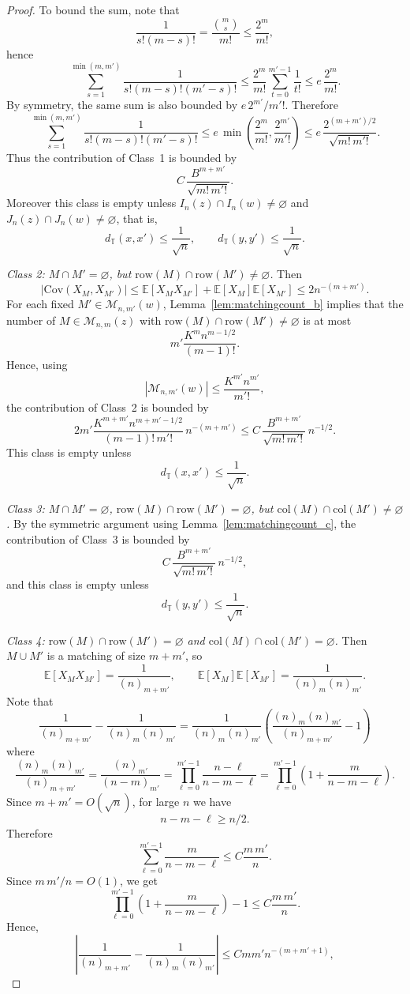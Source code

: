 \documentclass[10pt,a4paper]{amsart}
\newcommand{\cov}{\mathrm{Cov}}
\begin{document}
\begin{proof}
To bound the sum, note that
\[
\frac{1}{s!(m-s)!}=\frac{\binom{m}{s}}{m!}\le \frac{2^m}{m!},
\]
hence
\[
\sum_{s=1}^{\min(m,m')}
\frac{1}{s!(m-s)!(m'-s)!}
\le
\frac{2^m}{m!}\sum_{t=0}^{m'-1}\frac{1}{t!}
\le
e\,\frac{2^m}{m!}.
\]
By symmetry, the same sum is also bounded by $e\,2^{m'}/m'!$. Therefore
\[
\sum_{s=1}^{\min(m,m')}
\frac{1}{s!(m-s)!(m'-s)!}
\le
e\,\min\!\left(\frac{2^m}{m!},\frac{2^{m'}}{m'!}\right)
\le
e\,\frac{2^{(m+m')/2}}{\sqrt{m!\,m'!}}.
\]
Thus the contribution of Class~1 is bounded by
\[
C\,\frac{B^{m+m'}}{\sqrt{m!\,m'!}}.
\]
Moreover this class is empty unless $I_n(z)\cap I_n(w)\neq\varnothing$ and $J_n(z)\cap J_n(w)\neq\varnothing$, that is,
\[
d_{\mathbb{T}}(x, x') \leq \frac{1}{\sqrt{n}}, \qquad d_{\mathbb{T}}(y, y') \leq \frac{1}{\sqrt{n}}.
\]

\smallskip
\noindent
\emph{Class 2: $M\cap M'=\varnothing$, but $\mathrm{row}(M)\cap\mathrm{row}(M')\neq\varnothing$.}
Then
\[
|\cov(X_M,X_{M'})|
\le
\mathbb{E}[X_MX_{M'}]+\mathbb{E}[X_M]\mathbb{E}[X_{M'}]
\le
2n^{-(m+m')}.
\]
For each fixed $M'\in\mathcal M_{n,m'}(w)$, Lemma~\ref{lem:matchingcount_b} implies that the number of
$M\in\mathcal M_{n,m}(z)$ with $\mathrm{row}(M)\cap\mathrm{row}(M')\neq\varnothing$ is at most
\[
m'\frac{K^m n^{m-1/2}}{(m-1)!}.
\]
Hence, using
\[
|\mathcal M_{n,m'}(w)|\le \frac{K^{m'} n^{m'}}{m'!},
\]
the contribution of Class~2 is bounded by
\[
2m'\frac{K^{m+m'} n^{m+m'-1/2}}{(m-1)!\,m'!}\,n^{-(m+m')}
\le
C\,\frac{B^{m+m'}}{\sqrt{m!\,m'!}}\,n^{-1/2}.
\]
This class is empty unless
\[
d_{\mathbb{T}}(x, x') \leq \frac{1}{\sqrt{n}}.
\]

\smallskip
\noindent
\emph{Class 3: $M\cap M'=\varnothing$, $\mathrm{row}(M)\cap\mathrm{row}(M')=\varnothing$, but
$\mathrm{col}(M)\cap\mathrm{col}(M')\neq\varnothing$.}
By the symmetric argument using Lemma~\ref{lem:matchingcount_c}, the contribution of Class~3 is bounded by
\[
C\,\frac{B^{m+m'}}{\sqrt{m!\,m'!}}\,n^{-1/2},
\]
and this class is empty unless
\[
d_{\mathbb{T}}(y, y') \leq \frac{1}{\sqrt{n}}.
\]

\smallskip
\noindent
\emph{Class 4: $\mathrm{row}(M)\cap\mathrm{row}(M')=\varnothing$ and $\mathrm{col}(M)\cap\mathrm{col}(M')=\varnothing$.}
Then $M\cup M'$ is a matching of size $m+m'$, so
\[
\mathbb{E}[X_MX_{M'}]=\frac{1}{(n)_{m+m'}},
\qquad
\mathbb{E}[X_M]\mathbb{E}[X_{M'}]=\frac{1}{(n)_m (n)_{m'}}.
\]
Note that 
\[
\frac{1}{(n)_{m+m'}}-\frac{1}{(n)_m (n)_{m'}} = \frac{1}{(n)_{m}(n)_{m'}}\left( \frac{(n)_{m}(n)_{m'}}{(n)_{m + m'}} - 1\right)
\]
where 
\[
\frac{(n)_{m}(n)_{m'}}{(n)_{m + m'}} = \frac{(n)_{m'}}{(n - m)_{m'}} = \prod_{\ell = 0}^{m' - 1}\frac{n - \ell}{n - m - \ell} = \prod_{\ell = 0}^{m' - 1}\left(1 + \frac{m}{n - m - \ell}\right).
\]
Since $m + m' = O(\sqrt{n})$, for large $n$ we have
\[
n - m - \ell \geq n/2.
\]
Therefore 
\[
\sum_{\ell = 0}^{m' - 1}\frac{m}{n - m - \ell} \leq C\frac{m\,m'}{n}.
\]
Since $m\, m' / n = O(1)$, we get
\[
\prod_{\ell = 0}^{m' - 1}\left(1 + \frac{m}{n - m - \ell}\right) - 1 \leq C\frac{m\,m'}{n}.
\]
Hence,
\[
\left|
\frac{1}{(n)_{m+m'}}-\frac{1}{(n)_m (n)_{m'}}
\right|
\le
C m m' n^{-(m+m'+1)},
\]



\end{proof}
\end{document}
